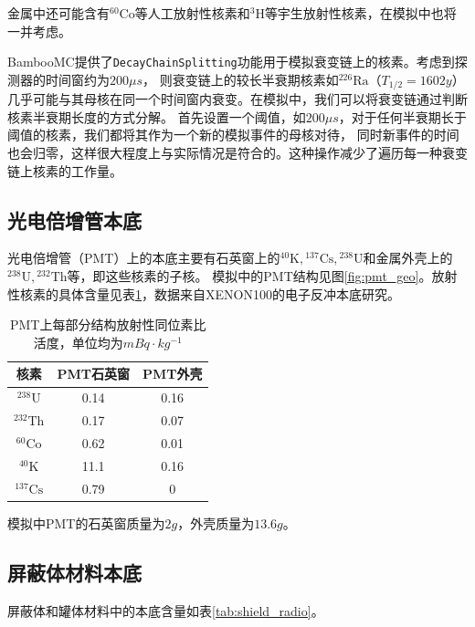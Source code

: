 金属中还可能含有${}^{60}\mathrm{Co}$等人工放射性核素和${}^{3}\mathrm{H}$等宇生放射性核素，在模拟中也将一并考虑。

BambooMC提供了\verb|DecayChainSplitting|功能用于模拟衰变链上的核素。考虑到探测器的时间窗约为$200\mu s$，
则衰变链上的较长半衰期核素如${}^{226}\mathrm{Ra}$（$T_{1/2}=1602y$）几乎可能与其母核在同一个时间窗内衰变。在模拟中，我们可以将衰变链通过判断核素半衰期长度的方式分解。
首先设置一个阈值，如$200\mu s$，对于任何半衰期长于阈值的核素，我们都将其作为一个新的模拟事件的母核对待，
同时新事件的时间也会归零，这样很大程度上与实际情况是符合的。这种操作减少了遍历每一种衰变链上核素的工作量。

\subsection{光电倍增管本底}
\label{sec:pmt_background}

光电倍增管（PMT）上的本底主要有石英窗上的${}^{40}\mathrm{K},{}^{137}\mathrm{Cs},{}^{238}\mathrm{U}$和金属外壳上的${}^{238}\mathrm{U},{}^{232}\mathrm{Th}$等，即这些核素的子核。
模拟中的PMT结构见图\ref{fig:pmt_geo}。放射性核素的具体含量见表\ref{tab:pmt_radio}，数据来自XENON100的电子反冲本底研究\cite{xenon100_collaboration_study_2013}。

\begin{table}
  \centering
  \caption{PMT上每部分结构放射性同位素比活度，单位均为$\si{mBq\cdot kg^{-1}}$}
  \begin{tabular}{ccc}
    \toprule
    核素 & PMT石英窗 & PMT外壳 \\
    \midrule
    ${}^{238}\mathrm{U}$ & 0.14 & 0.16 \\
    ${}^{232}\mathrm{Th}$ & 0.17 & 0.07 \\
    ${}^{60}\mathrm{Co}$ & 0.62 & 0.01 \\
    ${}^{40}\mathrm{K}$ & 11.1 & 0.16 \\
    ${}^{137}\mathrm{Cs}$ & 0.79 & 0 \\
    \bottomrule
  \end{tabular}
  \label{tab:pmt_radio}
\end{table}

模拟中PMT的石英窗质量为$2\si{g}$，外壳质量为$13.6\si{g}$。

\subsection{屏蔽体材料本底}

屏蔽体和罐体材料中的本底含量如表\ref{tab:shield_radio}。

